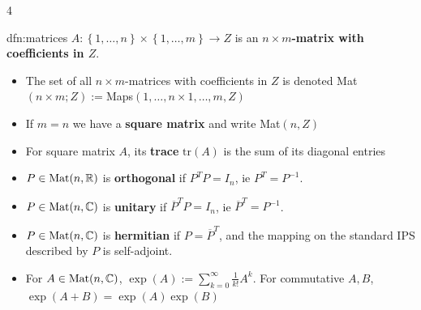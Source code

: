 \documentclass[landscape, 8pt]{extarticle}
\begin{document}
\begin{multicols*}{4}
		\begin{dfn}[Matrices]{dfn:matrices}{ }
		$A: \left\{1, \dots, n\right\} \times \left\{1, \dots, m\right\} \to Z$ is an \textbf{$n \times m$-matrix with coefficients in $Z$}.
		\begin{itemize}
			\item The set of all $n \times m$-matrices with coefficients in $Z$ is denoted Mat$(n \times m; Z) :=$Maps$({1, \dots, n} \times {1, \dots, m}, Z)$
			\item If $m = n$ we have a \textbf{square matrix} and write Mat$(n, Z)$
			\item For square matrix $A$, its \textbf{trace} $\text{tr}(A)$ is the sum of its diagonal entries
			\item $P \in \operatorname{Mat}(n, \mathbb{R})$ is \textbf{orthogonal} if $P^T P = I_n$, ie $P^T = P^{-1}$.
			\item $P \in \operatorname{Mat}(n, \mathbb{C})$ is \textbf{unitary} if $\overline{P}^TP = I_n$, ie $\overline{P}^T = P^{-1}$.
			\item $P \in \operatorname{Mat}(n, \mathbb{C})$ is \textbf{hermitian} if $P = \overline{P}^T$, and the mapping on the standard IPS described by $P$ is self-adjoint.
			\item For $A \in \operatorname{Mat}(n, \mathbb{C})$, $\exp(A) := \sum_{k = 0}^{\infty} \frac{1}{k!} A^k$. For commutative $A, B$, $\exp(A + B) = \exp(A) \exp(B)$
		\end{itemize}
		
		\end{dfn}
		

\end{multicols*}
\end{document}

